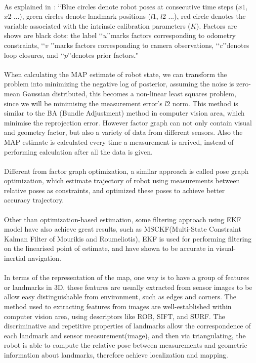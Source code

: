 \documentclass[12pt,twoside]{article}
\begin{document}
\\
As explained in \cite{cadena2016past}: \lq\lq Blue circles denote robot poses at
consecutive time steps ($x1$, $x2$ ...), green circles denote landmark positions
($l1$, $l2$ ...), red circle denotes the variable associated with the intrinsic
calibration parameters ($K$). Factors are shows are black dots: the label \lq\lq $u$\rq\rq marks factors corresponding to odometry constraints, \lq\lq $v$ \rq\rq marks factors corresponding to camera observations, \lq\lq $c$\rq\rq denotes loop closures, and \lq\lq $p$\rq\rq denotes prior factors."\\
\\
When calculating the MAP estimate of robot state, we can transform the problem into minimizing the negative log of posterior, assuming the noise is zero-mean Gaussian distributed, this becomes a non-linear least squares problem, since we will be minimising the measurement error's $l2$ norm. This method is similar to the BA (Bundle Adjustment) method in computer vision area, which minimise the reprojection error. However factor graph can not only contain visual and geometry factor, but also a variety of data from different sensors. Also the MAP estimate is calculated every time a measurement is arrived, instead of performing calculation  after all the data is given.\\
\\
Different from factor graph optimization, a similar approach is called pose graph optimization, which estimate trajectory of robot using measurements between relative poses as constraints, and optimized these poses to achieve better accuracy trajectory.\\
\\
Other than optimization-based estimation, some filtering approach using EKF model have also achieve great results, such as MSCKF(Multi-State Constraint Kalman Filter of Mourikis and Roumeliotis)\cite{mourikis2007multi}, EKF is used for performing filtering on the linearised point of estimate, and have shown to be accurate in visual-inertial navigation.\\
\\
In terms of the representation of the map, one way is to have a group of features or landmarks in 3D, these features are usually extracted from sensor images to be allow easy distinguishable from environment, such as edges and corners. The method used to extracting features from images are well-established within computer vision area, using descriptors like ROB, SIFT, and SURF. The discriminative and repetitive properties of landmarks allow the correspondence of each landmark and sensor measurement(image), and then via triangulating, the robot is able to compute the relative pose between measurements and geometric information about landmarks, therefore achieve localization and mapping.\\
\end{document}
